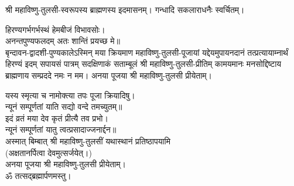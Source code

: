 श्री महाविष्णु-तुलसी-स्वरूपस्य ब्राह्मणस्य इदमासनम्। गन्धादि सकलाराधनैः स्वर्चितम्।

हिरण्यगर्भगर्भस्थं हेमबीजं विभावसोः।\\
अनन्तपुण्यफलदम् अतः शान्तिं प्रयच्छ मे॥\\

बृन्दावन-द्वादशी-पुण्यकालेऽस्मिन् मया क्रियमाण महाविष्णु-तुलसी-पूजायां यद्देयमुपायनदानं तत्प्रत्यायाम्नार्थं
हिरण्यं इदम् सपायसं पात्रम् सदक्षिणाकं सताम्बूलं श्री महाविष्णु-तुलसी-प्रीतिम्
कामयमानः मनसोद्दिष्टाय ब्राह्मणाय सम्प्रददे नमः न मम।
अनया पूजया श्री महाविष्णु-तुलसी प्रीयेताम्।

यस्य स्मृत्या च नामोक्त्या तपः पूजा क्रियादिषु।\\
न्यूनं सम्पूर्णतां याति सद्यो वन्दे तमच्युतम्॥ \\
इदं व्रतं मया देव कृतं प्रीत्यै तव प्रभो।\\
न्यूनं सम्पूर्णतां यातु त्वत्प्रसादाज्जनार्द्दन॥\\

अस्मात् बिम्बात् श्री महाविष्णु-तुलसीं यथास्थानं प्रतिष्ठापयामि\\
(अक्षतानर्पित्वा देवमुत्सर्जयेत्।)\\
अनया पूजया श्री महाविष्णु-तुलसी प्रीयेताम्। \\
ॐ तत्सद्ब्रह्मार्पणमस्तु।